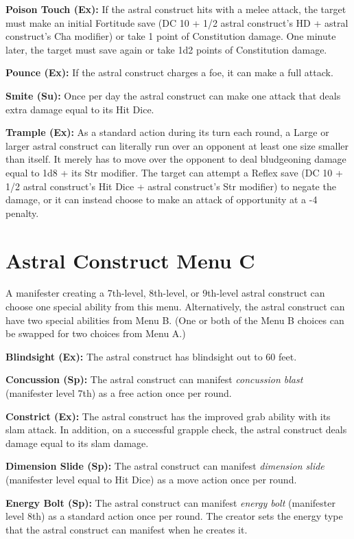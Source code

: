\documentclass{article}
\begin{document}
\textbf{Poison Touch (Ex):} If the astral construct hits with a melee attack, the 
target must make an initial Fortitude save (DC 10 + 1/2 astral construct's HD + 
astral construct's Cha modifier) or take 1 point of Constitution damage. One minute 
later, the target must save again or take 1d2 points of Constitution damage.

\textbf{Pounce (Ex):} If the astral construct charges a foe, it can make a full 
attack. 

\textbf{Smite (Su):} Once per day the astral construct can make one attack that 
deals extra damage equal to its Hit Dice.

\textbf{Trample (Ex):} As a standard action during its turn each round, a Large 
or larger astral construct can literally run over an opponent at least one size 
smaller than itself. It merely has to move over the opponent to deal bludgeoning 
damage equal to 1d8 + its Str modifier. The target can attempt a Reflex save (DC 
10 + 1/2 astral construct's Hit Dice + astral construct's Str modifier) to negate 
the damage, or it can instead choose to make an attack of opportunity at a -4 penalty.

\vspace{12pt}
\section*{Astral Construct Menu C}

A manifester creating a 7th-level, 8th-level, or 9th-level astral construct can 
choose one special ability from this menu. Alternatively, the astral construct 
can have two special abilities from Menu B. (One or both of the Menu B choices 
can be swapped for two choices from Menu A.)

\textbf{Blindsight (Ex): }The astral construct has blindsight out to 60 feet.

\textbf{Concussion (Sp):} The astral construct can manifest \textit{concussion 
blast }(manifester level 7th) as a free action once per round.

\textbf{Constrict (Ex):} The astral construct has the improved grab ability with 
its slam attack. In addition, on a successful grapple check, the astral construct 
deals damage equal to its slam damage.

\textbf{Dimension Slide (Sp):} The astral construct can manifest \textit{dimension 
slide }(manifester level equal to Hit Dice) as a move action once per round.

\textbf{Energy Bolt (Sp):} The astral construct can manifest \textit{energy bolt 
}(manifester level 8th) as a standard action once per round. The creator sets the 
energy type that the astral construct can manifest when he creates it. 
\end{document}
